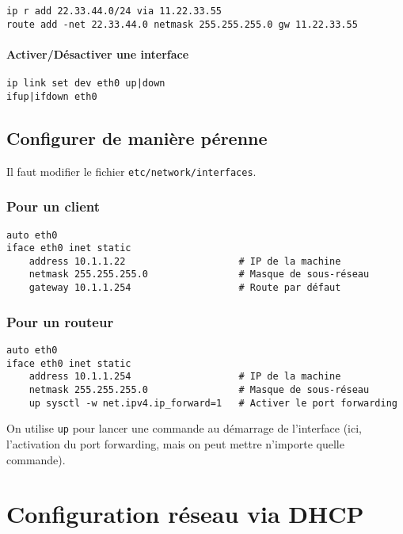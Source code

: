 \documentclass[10pt,a4paper,french]{article}
\begin{document}
\begin{verbatim}
ip r add 22.33.44.0/24 via 11.22.33.55
route add -net 22.33.44.0 netmask 255.255.255.0 gw 11.22.33.55
\end{verbatim}

\paragraph{Activer/Désactiver une interface}

\begin{verbatim}
ip link set dev eth0 up|down
ifup|ifdown eth0
\end{verbatim}

\subsection{Configurer de manière pérenne}

Il faut modifier le fichier {\tt etc/network/interfaces}.

\subsubsection{Pour un client}

\begin{verbatim}
auto eth0
iface eth0 inet static
	address 10.1.1.22                    # IP de la machine
	netmask 255.255.255.0                # Masque de sous-réseau
	gateway 10.1.1.254                   # Route par défaut
\end{verbatim}

\subsubsection{Pour un routeur}

\begin{verbatim}
auto eth0
iface eth0 inet static
	address 10.1.1.254                   # IP de la machine
	netmask 255.255.255.0                # Masque de sous-réseau
	up sysctl -w net.ipv4.ip_forward=1   # Activer le port forwarding
\end{verbatim}

On utilise {\tt up} pour lancer une commande au démarrage de l'interface (ici, l'activation du port forwarding, mais on peut mettre n'importe quelle commande).

\section{Configuration réseau via DHCP}
\end{document}

